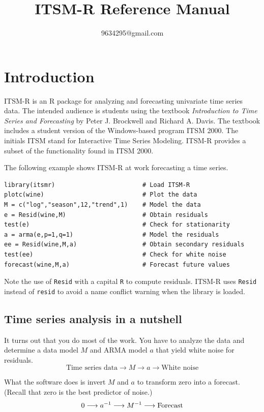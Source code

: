 \documentclass[12pt]{article}
\title{ITSM-R Reference Manual}
\author{9634295@gmail.com}
\begin{document}
\maketitle
\newpage
\tableofcontents
\newpage

\section{Introduction}
ITSM-R is an R package for analyzing and forecasting univariate
time series data.
The intended audience is students using the textbook
{\it Introduction to Time Series and Forecasting}
by Peter J. Brockwell and Richard A. Davis.
The textbook includes a student version of the Windows-based program ITSM 2000.
The initials ITSM stand for Interactive Time Series Modeling.
ITSM-R provides a subset of the functionality found in ITSM 2000.

\bigskip
The following example shows ITSM-R at work forecasting a time series.

\begin{verbatim}
library(itsmr)                        # Load ITSM-R
plotc(wine)                           # Plot the data
M = c("log","season",12,"trend",1)    # Model the data
e = Resid(wine,M)                     # Obtain residuals
test(e)                               # Check for stationarity
a = arma(e,p=1,q=1)                   # Model the residuals
ee = Resid(wine,M,a)                  # Obtain secondary residuals
test(ee)                              # Check for white noise
forecast(wine,M,a)                    # Forecast future values
\end{verbatim}

Note the use of {\tt Resid} with a capital {\tt R} to compute residuals.
ITSM-R uses {\tt Resid} instead of {\tt resid} to avoid a name conflict
warning when the library is loaded.

\subsection{Time series analysis in a nutshell}
It turns out that you do most of the work.
You have to analyze the data and
determine a data model $M$ and ARMA model $a$
that yield white noise for residuals.
\[
\text{Time series data}
\longrightarrow M\longrightarrow a\longrightarrow
\text{White noise}
\]

What the software does is invert $M$ and $a$ to transform zero into a forecast.
(Recall that zero is the best predictor of noise.)
\[
0\longrightarrow a^{-1}\longrightarrow M^{-1}\longrightarrow{\rm Forecast}
\]
\end{document}
